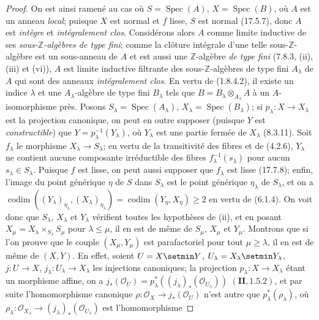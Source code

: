 \begin{proof}
On est ainsi ramené au cas où $S=\operatorname{Spec}(A)$,
$X=\operatorname{Spec}(B)$, où $A$ est un anneau \emph{local}; puisque $X$ est
normal et $f$ lisse, $S$ est normal (17.5.7), donc $A$ est \emph{intègre} et
\emph{intégralement clos}. Considérons alors $A$ comme limite inductive de ses
\emph{sous-$\mathbb Z$-algèbres de type fini}; comme la clôture intégrale d'une telle
sous-$\mathbb Z$-algèbre est un sous-anneau de $A$ et est aussi une
$\mathbb Z$-algèbre \emph{de type fini} (7.8.3, (ii), (iii) et (vi)), $A$ est limite inductive
filtrante des sous-$\mathbb Z$-algèbres de type fini $A_\lambda$ de $A$ qui sont des
anneaux \emph{intégralement clos}. En vertu de (1.8.4.2), il existe un indice
$\lambda$ et une $A_\lambda$-algèbre de type fini $B_\lambda$ tels que $B=B_\lambda\otimes_{A_\lambda}A$
à un $A$-isomorphisme près. Posons $S_\lambda=\operatorname{Spec}(A_\lambda)$,
$X_\lambda=\operatorname{Spec}(B_\lambda)$; si $p_\lambda:X\to X_\lambda$ est la
projection canonique, on peut en outre supposer (puisque $Y$ est
\emph{constructible}) que $Y=p_\lambda^{-1}(Y_\lambda)$, où $Y_\lambda$ est une
partie fermée de $X_\lambda$ (8.3.11). Soit $f_\lambda$ le morphisme
$X_\lambda\to S_\lambda$; en vertu de la transitivité des fibres et de (4.2.6),
$Y_\lambda$ ne contient aucune composante irréductible des fibres
$f_\lambda^{-1}(s_\lambda)$ pour aucun $s_\lambda\in S_\lambda$. Puisque $f$ est
lisse, on peut aussi supposer que $f_\lambda$ est lisse (17.7.8); enfin, l'image du
point générique $\eta$ de $S$ dans $S_\lambda$ est le point générique $\eta_\lambda$
de $S_\lambda$, et on a
$\operatorname{codim}((Y_\lambda)_{\eta_\lambda},(X_\lambda)_{\eta_\lambda})=\operatorname{codim}(Y_\eta,X_\eta)\geq2$
en vertu de (6.1.4). On voit donc que $S_\lambda$, $X_\lambda$ et $Y_\lambda$
vérifient toutes les hypothèses de (ii), et en posant
$X_\mu=X_\lambda\times_{S_\lambda}S_\mu$ pour $\lambda\leq\mu$, il en est de même de
$S_\mu$, $X_\mu$ et $Y_\mu$. Montrons que si l'on prouve que le couple
$(X_\mu,Y_\mu)$ est parafactoriel pour tout $\mu\geq\lambda$, il en est de même de
$(X,Y)$. En effet, soient $U=X\setmin Y$, $U_\lambda=X_\lambda\setmin Y_\lambda$, $j:U\to X$,
$j_\lambda:U_\lambda\to X_\lambda$ les injections canoniques; la projection
$p_\lambda:X\to X_\lambda$ étant un morphisme affine, on a
$j_*(\mathcal O_U)=p_\lambda^*((j_\lambda)_*(\mathcal O_{U_\lambda}))$ $(\mathbf{II}, 1.5.2)$,
et par suite l'homomorphisme canonique
$\rho:\mathcal O_X\to j_*(\mathcal O_U)$ n'est autre que $p_\lambda^*(\rho_\lambda)$, où
$\rho_\lambda:\mathcal O_{X_\lambda}\to(j_\lambda)_*(\mathcal O_{U_\lambda})$ est l'homomorphisme

\end{proof}
